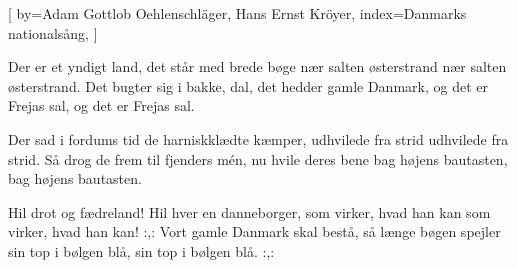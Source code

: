 

[
by={Adam Gottlob Oehlenschläger, Hans Ernst Kröyer},
index={Danmarks nationalsång},
]

\beginverse*
Der er et yndigt land, 
det står med brede bøge 
nær salten østerstrand 
nær salten østerstrand. 
Det bugter sig i bakke, dal, 
det hedder gamle Danmark, 
og det er Frejas sal, 
og det er Frejas sal.
\endverse

\beginverse*
Der sad i fordums tid 
de harniskklædte kæmper, 
udhvilede fra strid 
udhvilede fra strid. 
Så drog de frem til fjenders mén, 
nu hvile deres bene 
bag højens bautasten, 
bag højens bautasten.
\endverse

\beginverse*
Hil drot og fædreland! 
Hil hver en danneborger, 
som virker, hvad han kan 
som virker, hvad han kan! 
:,: Vort gamle Danmark skal bestå, 
så længe bøgen spejler 
sin top i bølgen blå, 
sin top i bølgen blå. :,:
\endverse
\endsong



